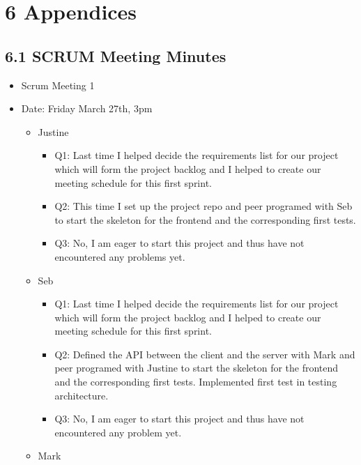 \documentclass[]{article}
\begin{document}
\section{6 Appendices}\label{appendices}

\subsection{6.1 SCRUM Meeting Minutes}\label{scrum-meeting-minutes}

\begin{itemize}
\itemsep1pt\parskip0pt
\item
  Scrum Meeting 1
\item
  Date: Friday March 27th, 3pm

  \begin{itemize}
  \itemsep1pt\parskip0pt
  \item
    Justine

    \begin{itemize}
    \itemsep1pt\parskip0pt
    \item
      Q1: Last time I helped decide the requirements list for our
      project which will form the project backlog and I helped to create
      our meeting schedule for this first sprint.
    \item
      Q2: This time I set up the project repo and peer programed with
      Seb to start the skeleton for the frontend and the corresponding
      first tests.
    \item
      Q3: No, I am eager to start this project and thus have not
      encountered any problems yet.
    \end{itemize}
  \item
    Seb

    \begin{itemize}
    \itemsep1pt\parskip0pt
    \item
      Q1: Last time I helped decide the requirements list for our
      project which will form the project backlog and I helped to create
      our meeting schedule for this first sprint.
    \item
      Q2: Defined the API between the client and the server with Mark
      and peer programed with Justine to start the skeleton for the
      frontend and the corresponding first tests. Implemented first test
      in testing architecture.
    \item
      Q3: No, I am eager to start this project and thus have not
      encountered any problem yet.
    \end{itemize}
  \item
    Mark


\end{itemize}
\end{itemize}
\end{document}
